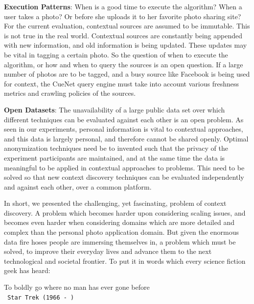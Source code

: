 \textbf{\textbf{Execution Patterns}}: When is a good time to execute the algorithm? When a user takes a photo? Or before she uploads it to her favorite photo sharing site? For the current evaluation, contextual sources are assumed to be immutable. This is not true in the real world. Contextual sources are constantly being appended with new information, and old information is being updated. These updates may be vital in tagging a certain photo. So the question of when to execute the algorithm, or how and when to query the sources is an open question. If a large number of photos are to be tagged, and a busy source like Facebook is being used for context, the CueNet query engine must take into account various freshness metrics and crawling policies of the sources. 

\textbf{\textbf{Open Datasets}}: The unavailability of a large public data set over which different techniques can be evaluated against each other is an open problem. As seen in our experiments, personal information is vital to contextual approaches, and this data is largely personal, and therefore cannot be shared openly. Optimal anonymization techniques need be to invented such that the privacy of the experiment participants are maintained, and at the same time the data is meaningful to be applied in contextual approaches to problems. This need to be solved so that new context discovery techniques can be evaluated independently and against each other, over a common platform.

In short, we presented the challenging, yet fascinating, problem of context discovery. A problem which becomes harder upon considering scaling issues, and becomes even harder when considering domains which are more detailed and complex than the personal photo application domain. But given the enormous data fire hoses people are immersing themselves in, a problem which must be solved, to improve their everyday lives and advance them to the next technological and societal frontier. To put it in words which every science fiction geek has heard:

\centering
To boldly go where no man has ever gone before \\
\setlength{\parindent}{12cm} \texttt{ Star Trek (1966 - ) } 